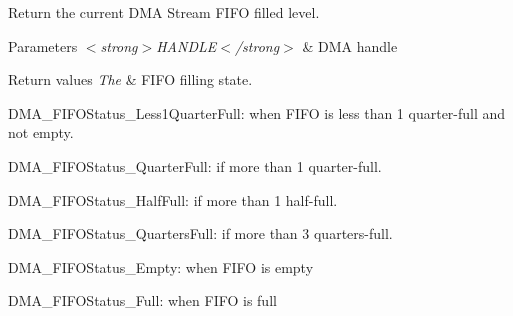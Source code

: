 Return the current D\+MA Stream F\+I\+FO filled level. 


\begin{DoxyParams}{Parameters}
{\em $<$strong$>$\+H\+A\+N\+D\+L\+E$<$/strong$>$} & D\+MA handle \\
\hline
\end{DoxyParams}

\begin{DoxyRetVals}{Return values}
{\em The} & F\+I\+FO filling state.
\begin{DoxyItemize}
\item D\+M\+A\+\_\+\+F\+I\+F\+O\+Status\+\_\+\+Less1\+Quarter\+Full\+: when F\+I\+FO is less than 1 quarter-\/full and not empty.
\item D\+M\+A\+\_\+\+F\+I\+F\+O\+Status\+\_\+Quarter\+Full\+: if more than 1 quarter-\/full.
\item D\+M\+A\+\_\+\+F\+I\+F\+O\+Status\+\_\+\+Half\+Full\+: if more than 1 half-\/full.
\item D\+M\+A\+\_\+\+F\+I\+F\+O\+Status\+\_\+Quarters\+Full\+: if more than 3 quarters-\/full.
\item D\+M\+A\+\_\+\+F\+I\+F\+O\+Status\+\_\+\+Empty\+: when F\+I\+FO is empty
\item D\+M\+A\+\_\+\+F\+I\+F\+O\+Status\+\_\+\+Full\+: when F\+I\+FO is full 
\end{DoxyItemize}\\
\hline
\end{DoxyRetVals}
